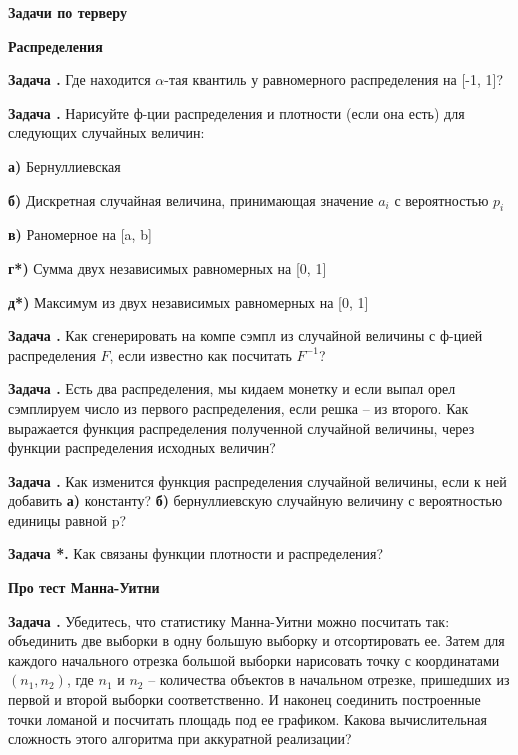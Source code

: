 \documentclass[12pt,a4paper]{article}
\newcounter{znum}
\newcommand{\z}[1]{\addtocounter{znum}{1} \textbf{Задача \arabic{znum}#1. }}
\renewcommand{\!}{\textcolor{red}{!}}
\begin{document}
	
\thispagestyle{empty}
\begin{center}
	\large
	\textbf{Задачи по терверу}
	\normalsize
\end{center}


\begin{center}
	\textbf{Распределения}
\end{center}

\z{} Где находится $\alpha$-тая квантиль у равномерного распределения на [-1, 1]?

\z{} Нарисуйте ф-ции распределения и плотности (если она есть) для следующих случайных величин:  

\textbf{а)} Бернуллиевская  

\textbf{б)} Дискретная случайная величина, принимающая значение $a_i$ с вероятностью $p_i$  

\textbf{в)} Раномерное на [a, b]  

\textbf{г*)} Сумма двух независимых равномерных на [0, 1]  

\textbf{д*)} Максимум из двух независимых равномерных на [0, 1]  

\z{} Как сгенерировать на компе сэмпл из случайной величины с ф-цией распределения $F$, если известно как посчитать $F^{-1}$?

\z{} Есть два распределения, мы кидаем монетку и если выпал орел сэмплируем число из первого распределения, если решка -- из второго. Как выражается функция распределения полученной случайной величины, через функции распределения исходных величин?

\z{} Как изменится функция распределения случайной величины, если к ней добавить \textbf{а)} константу? \textbf{б)} бернуллиевскую случайную величину с вероятностью единицы равной p?

\z{*} Как связаны функции плотности и распределения?

\begin{center}
	\textbf{Про тест Манна-Уитни}
\end{center}

\z{} Убедитесь, что статистику Манна-Уитни можно посчитать так: объединить две выборки в одну большую выборку и отсортировать ее. Затем для каждого начального отрезка большой выборки нарисовать точку с координатами $(n_1, n_2)$, где $n_1$ и $n_2$ -- количества объектов в начальном отрезке, пришедших из первой и второй выборки соответственно. И наконец соединить построенные точки ломаной и посчитать площадь под ее графиком. Какова вычислительная сложность этого алгоритма при аккуратной реализации?
\end{document}
